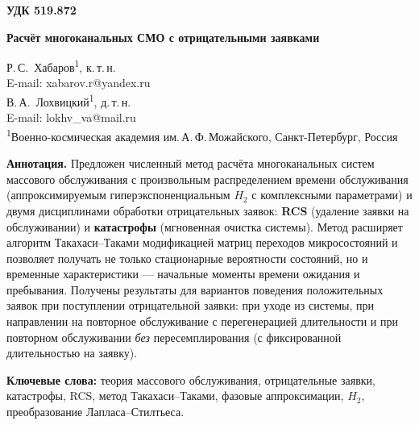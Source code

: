 

\noindent\textbf{УДК 519.872}
\vspace{1em}

\begin{center}
{\Large\bfseries Расчёт многоканальных СМО с отрицательными заявками}
\end{center}
\vspace{0.8em}

\begin{center}
Р.\,С.~Хабаров\textsuperscript{1}, к.\,т.\,н.\\[2pt]
E-mail: xabarov.r@yandex.ru\\[6pt]
В.\,А.~Лохвицкий\textsuperscript{1}, д.\,т.\,н.\\[2pt]
E-mail: lokhv\_va@mail.ru\\[8pt]
{\small\textsuperscript{1}Военно-космическая академия им.\,А.\,Ф.\,Можайского, Санкт-Петербург, Россия}
\end{center}
\vspace{0.5em}

\noindent\textbf{Аннотация.} 
Предложен численный метод расчёта многоканальных систем массового обслуживания с произвольным распределением времени обслуживания (аппроксимируемым гиперэкспоненциальным \(H_2\) с комплексными параметрами) 
и двумя дисциплинами обработки отрицательных заявок: \textbf{RCS} (удаление заявки на обслуживании) и \textbf{катастрофы} (мгновенная очистка системы). 
Метод расширяет алгоритм Такахаси--Таками модификацией матриц переходов микросостояний и позволяет получать не только стационарные вероятности состояний, но и временные характеристики --- начальные моменты времени ожидания и пребывания. 
Получены результаты для вариантов поведения положительных заявок при поступлении отрицательной заявки: при уходе из системы, при направлении на повторное обслуживание с перегенерацией длительности и при повторном обслуживании \emph{без} пересемплирования (с фиксированной длительностью на заявку). 


\textbf{Ключевые слова:} теория массового обслуживания, отрицательные заявки, катастрофы, RCS, метод Такахаси--Таками, фазовые аппроксимации, \(H_2\), преобразование Лапласа--Стилтьеса.

